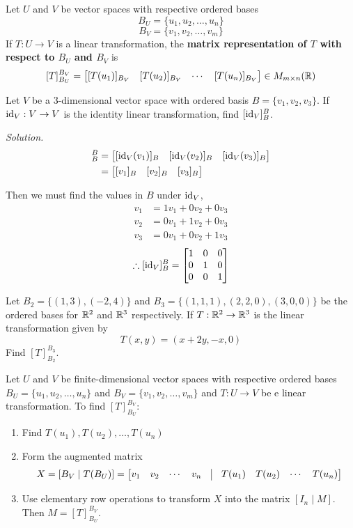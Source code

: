 \begin{definition}
Let $U$ and $V$ be vector spaces with respective ordered bases
$$B_U = \{u_1, u_2, \dots, u_n\}$$
$$B_V = \{v_1, v_2, \dots, v_m\}$$
If $T: U \to V$ is a linear transformation, the \textbf{matrix representation of $T$ with respect to $B_U$ and $B_V$} is
$$[T]_{B_U}^{B_V} = \begin{bmatrix} [T(u_1)]_{B_V} & [T(u_2)]_{B_V} & \cdots & [T(u_n)]_{B_V} \end{bmatrix} \in M_{m \times n}(\mathbb{R})$$
\end{definition}

\begin{example}
Let $V$ be a $3$-dimensional vector space with ordered basis $B = \{v_1, v_2, v_3\}$. If $\operatorname{id}_V: V \to V$ is the identity linear transformation, find $[\operatorname{id}_V]_B^B$.

\textit{Solution.} 
\begin{align*}
[\id_V]_B^B &= \bmat{[\id_V(v_1)]_B & [\id_V(v_2)]_B & [\id_V(v_3)]_B} \\
&=\bmat{[v_1]_B & [v_2]_B & [v_3]_B}
\end{align*}
\end{example}

\newpage
Then we must find the values in $B$ under $\operatorname{id}_V$,
\begin{align*}
v_1 &= 1v_1 + 0v_2 + 0v_3 \\
v_2 &= 0v_1 + 1v_2 + 0v_3 \\
v_3 &= 0v_1 + 0v_2 + 1v_3
\end{align*}
$$\therefore [\operatorname{id}_V]_B^B = \begin{bmatrix} 1 & 0 & 0 \\ 0 & 1 & 0 \\ 0 & 0 & 1 \end{bmatrix}$$

\begin{example}
Let $B_2 = \{(1, 3), (-2, 4)\}$ and $B_3 = \{(1, 1, 1), (2, 2, 0),(3,0,0)\}$ be the ordered bases for $\mathbb{R}^2$ and $\mathbb{R}^3$ respectively. If $T: \mathbb{R}^2 \to \mathbb{R}^3$ is the linear transformation given by
$$T(x, y) = (x + 2y, -x, 0)$$
Find $[T]_{B_2}^{B_3}$.
\end{example}

\begin{remark}
Let $U$ and $V$ be finite-dimensional vector spaces with respective ordered bases $B_U = \{u_1, u_2, \dots, u_n\}$ and $B_V = \{v_1, v_2, \dots, v_m\}$ and $T: U \to V$ be e linear transformation. To find $[T]_{B_U}^{B_V}$:
\begin{enumerate}
    \item Find $T(u_1), T(u_2), \dots, T(u_n)$
    \item Form the augmented matrix
    $$X = [B_V \mid T(B_U)] = \bmat{v_1 & v_2 & \cdots & v_n & \vline & T(u_1) & T(u_2) & \cdots & T(u_n)}$$
    \item Use elementary row operations to transform $X$ into the matrix $[I_n \mid M]$. Then $M = [T]_{B_U}^{B_V}$.
\end{enumerate}
\end{remark}

